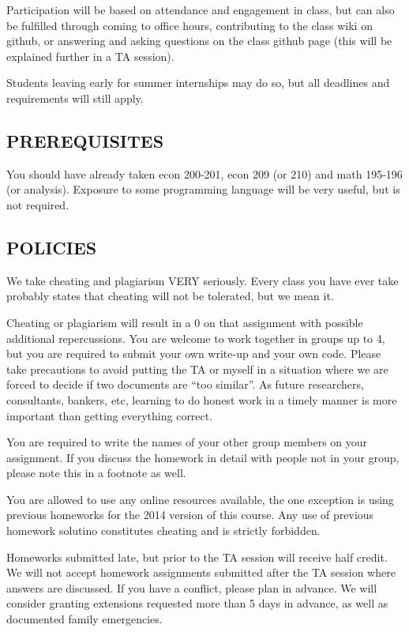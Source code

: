\documentclass{scrartcl}
\begin{document}
Participation will be based on attendance and engagement in class, but can also be fulfilled through coming to office hours, contributing to the class wiki on github, or answering and asking questions on the class github page (this will be explained further in a TA session).

Students leaving early for summer internships may do so, but all deadlines and requirements will still apply. 

\subsection*{PREREQUISITES}
You should have already taken econ 200-201, econ 209 (or 210) and math 195-196 (or analysis). Exposure to some programming language will be very useful, but is not required. 

\subsection*{POLICIES}

We take cheating and plagiarism VERY seriously. Every class you have ever take probably states that cheating will not be tolerated, but we mean it. %

Cheating or plagiarism will result in a 0 on that assignment with possible additional repercussions. You are welcome to work together in groups up to 4, but you are required to submit your own write-up and your own code. Please take precautions to avoid putting the TA or myself in a situation where we are forced to decide if two documents are ``too similar''. As future researchers, consultants, bankers, etc, learning to do honest work in a timely manner is more important than getting everything correct.

You are required to write the names of your other group members on your assignment. If you discuss the homework in detail with people not in your group, please note this in a footnote as well.

You are allowed to use any online resources available, the one exception is using previous homeworks for the 2014 version of this course. Any use of previous homework solutino constitutes cheating and is strictly forbidden. 

Homeworks submitted late, but prior to the TA session will receive half credit. We will not accept homework assignments submitted after the TA session where answers are discussed. If you have a conflict, please plan in advance. We will consider granting extensions requested more than 5 days in advance, as well as documented family emergencies.
\end{document}
